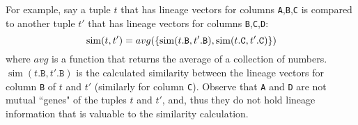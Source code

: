 \begin{enumerate}
\begin{enumerate}
        For example, say a tuple $t$ that has lineage vectors for columns \texttt{A},\texttt{B},\texttt{C} is compared to another tuple $t'$ that has lineage vectors for columns \texttt{B},\texttt{C},\texttt{D}:\\
        \begin{equation*}
            \operatorname{sim}(t, t') = avg(\{\operatorname{sim}(t.\texttt{B}, t'.\texttt{B}), 
            \operatorname{sim}(t.\texttt{C}, t'.\texttt{C})\})\\
        \end{equation*}
        where $avg$ is a function that returns the average of a collection of numbers. $\operatorname{sim}(t.\texttt{B}, t'.\texttt{B})$ is the calculated similarity between the lineage vectors for column \texttt{B} of $t$ and $t'$ (similarly for column \texttt{C}). Observe that \texttt{A} and \texttt{D} are not mutual ``genes" of the tuples $t$ and $t'$, and, thus they do not hold lineage information that is valuable to the similarity calculation.
    \end{enumerate}

\end{enumerate}

